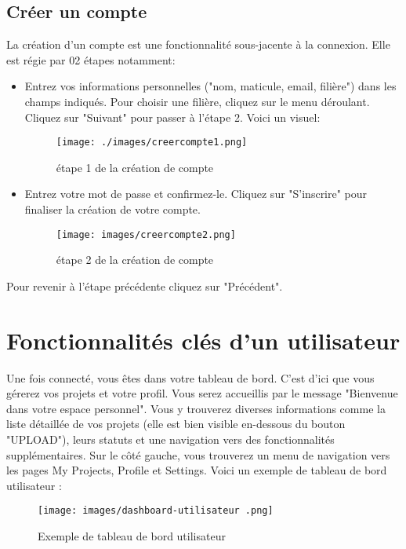 \documentclass[12pt]{article}
\begin{document}
\subsection{Créer un compte}
La création d'un compte est une fonctionnalité sous-jacente à la connexion. Elle est régie par 02 étapes notamment:
\begin{itemize}
    \item Entrez vos informations personnelles ("nom, maticule, email, filière") dans les champs indiqués. Pour choisir une filière, cliquez sur le menu déroulant. Cliquez sur "Suivant" pour passer à l'étape 2. Voici un visuel:
            \begin{figure}[h!]
                \centering
                \texttt{[image: ./images/creercompte1.png]}
                \caption{étape 1 de la création de compte}
                \label{fig:étape 1 de la création de compte}
            \end{figure}
        \medskip       
    \item Entrez votre mot de passe et confirmez-le. Cliquez sur "S'inscrire" pour finaliser la création de votre compte.
            \begin{figure}[h!]
                \centering
                \texttt{[image: images/creercompte2.png]}
                \caption{étape 2 de la création de compte}
                \label{fig:etape2}
            \end{figure}
\end{itemize}
Pour revenir à l'étape précédente cliquez sur "Précédent".

\bigskip
\section{Fonctionnalités clés d'un utilisateur}
Une fois connecté, vous êtes dans votre tableau de bord. C'est d'ici que vous gérerez vos projets et votre profil. Vous serez accueillis par le message "Bienvenue dans votre espace personnel". Vous y trouverez diverses informations comme la liste détaillée de vos projets (elle est bien visible en-dessous du bouton "UPLOAD"), leurs statuts et une navigation vers des fonctionnalités supplémentaires. Sur le côté gauche, vous trouverez un menu de navigation vers les pages My Projects, Profile et Settings. Voici un exemple de tableau de bord utilisateur :

\begin{figure}[h!]
\centering
\texttt{[image: images/dashboard-utilisateur .png]}
\caption{Exemple de tableau de bord utilisateur}
\label{fig:dashboard user}
\end{figure}
\end{document}
